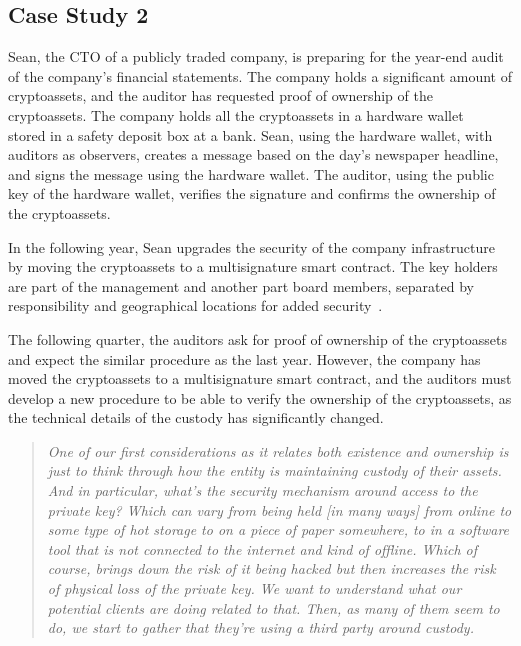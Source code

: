 \subsection{Case Study 2} \label{sec:auditing:case-studies:ownership} %
Sean, the CTO of a publicly traded company, is preparing for the year-end audit of the company's financial statements. The company holds a significant amount of cryptoassets, and the auditor has requested proof of ownership of the cryptoassets. The company holds all the cryptoassets in a hardware wallet~\cite{EBSC15} stored in a safety deposit box at a bank. Sean, using the hardware wallet, with auditors as observers, creates a message based on the day's newspaper headline, and signs the message using the hardware wallet. The auditor, using the public key of the hardware wallet, verifies the signature and confirms the ownership of the cryptoassets.

In the following year, Sean upgrades the security of the company infrastructure by moving the cryptoassets to a multisignature smart contract. The key holders are part of the management and another part board members, separated by responsibility and geographical locations for added security~\cite{c4ccssa}. 

The following quarter, the auditors ask for proof of ownership of the cryptoassets and expect the similar procedure as the last year. However, the company has moved the cryptoassets to a multisignature smart contract, and the auditors must develop a new procedure to be able to verify the ownership of the cryptoassets, as the technical details of the custody has significantly changed.

\begin{quote}
	\textit{One of our first considerations as it relates both existence and ownership is just to think through how the entity is maintaining custody of their assets. And in particular, what's the security mechanism around access to the private key? Which can vary from being held [in many ways] from online to some type of hot storage to on a piece of paper somewhere, to in a software tool that is not connected to the internet and kind of offline. Which of course, brings down the risk of it being hacked but then increases the risk of physical loss of the private key. We want to understand what our potential clients are doing related to that. Then, as many of them seem to do, we start to gather that they're using a third party around custody.}~\cite{pimentel2021systemizing}
\end{quote}

